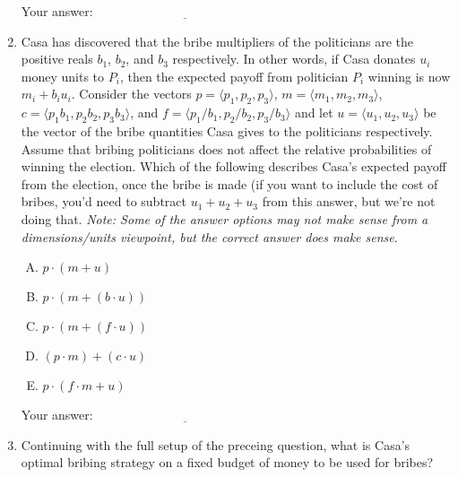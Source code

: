 \documentclass[10pt]{amsart}
\begin{document}
\begin{enumerate}
  \vspace{0.1in}
  Your answer: $\underline{\qquad\qquad\qquad\qquad\qquad\qquad\qquad}$
  \vspace{0.1in}

\item Casa has discovered that the bribe multipliers of the
  politicians are the positive reals $b_1$, $b_2$, and $b_3$
  respectively. In other words, if Casa donates $u_i$ money units to
  $P_i$, then the expected payoff from politician $P_i$ winning is now
  $m_i + b_iu_i$. Consider the vectors $p = \langle p_1,p_2,p_3
  \rangle$, $m = \langle m_1,m_2,m_3 \rangle$, $c = \langle p_1b_1,
  p_2b_2, p_3b_3 \rangle$, and $f = \langle p_1/b_1, p_2/b_2, p_3/b_3
  \rangle$ and let $u = \langle u_1,u_2,u_3\rangle$ be the vector of
  the bribe quantities Casa gives to the politicians
  respectively. Assume that bribing politicians does not affect the
  relative probabilities of winning the election. Which of the
  following describes Casa's expected payoff from the election, once
  the bribe is made (if you want to include the cost of bribes, you'd
  need to subtract $u_1 + u_2 + u_3$ from this answer, but we're not
  doing that. {\em Note: Some of the answer options may not make sense
  from a dimensions/units viewpoint, but the correct answer does make
  sense}.

  \begin{enumerate}[(A)]
  \item $p \cdot (m + u)$
  \item $p \cdot (m + (b \cdot u))$
  \item $p \cdot (m + (f \cdot u))$
  \item $(p \cdot m) + (c \cdot u)$
  \item $p \cdot (f \cdot m + u)$
  \end{enumerate}

  \vspace{0.1in}
  Your answer: $\underline{\qquad\qquad\qquad\qquad\qquad\qquad\qquad}$
  \vspace{0.1in}

\item Continuing with the full setup of the preceing question, what is
  Casa's optimal bribing strategy on a fixed budget of money to be
  used for bribes?


\end{enumerate}
\end{document}
